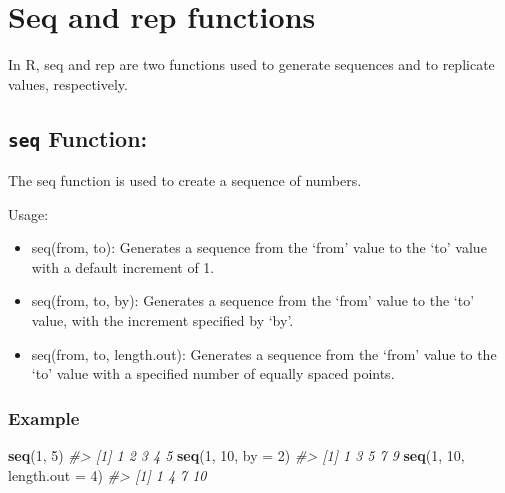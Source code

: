 \documentclass[
]{book}
\newenvironment{Shaded}{\begin{snugshade}}{\end{snugshade}}
\newcommand{\AttributeTok}[1]{\textcolor[rgb]{0.13,0.29,0.53}{#1}}
\newcommand{\CommentTok}[1]{\textcolor[rgb]{0.56,0.35,0.01}{\textit{#1}}}
\newcommand{\DecValTok}[1]{\textcolor[rgb]{0.00,0.00,0.81}{#1}}
\newcommand{\FunctionTok}[1]{\textcolor[rgb]{0.13,0.29,0.53}{\textbf{#1}}}
\newcommand{\NormalTok}[1]{#1}
\begin{document}
\section*{Seq and rep functions}\label{seq-and-rep-functions}

In R, seq and rep are two functions used to generate sequences and to replicate values, respectively.

\subsection{\texorpdfstring{\texttt{seq} Function:}{seq Function:}}\label{seq-function}

The seq function is used to create a sequence of numbers.

Usage:

\begin{itemize}
\item
  seq(from, to): Generates a sequence from the `from' value to the `to' value with a default increment of 1.
\item
  seq(from, to, by): Generates a sequence from the `from' value to the `to' value, with the increment specified by `by'.
\item
  seq(from, to, length.out): Generates a sequence from the `from' value to the `to' value with a specified number of equally spaced points.
\end{itemize}

\subsubsection*{Example}\label{example}

\begin{Shaded}
\begin{Highlighting}[]
\FunctionTok{seq}\NormalTok{(}\DecValTok{1}\NormalTok{, }\DecValTok{5}\NormalTok{)         }
\CommentTok{\#\textgreater{} [1] 1 2 3 4 5}
\FunctionTok{seq}\NormalTok{(}\DecValTok{1}\NormalTok{, }\DecValTok{10}\NormalTok{, }\AttributeTok{by =} \DecValTok{2}\NormalTok{)    }
\CommentTok{\#\textgreater{} [1] 1 3 5 7 9}
\FunctionTok{seq}\NormalTok{(}\DecValTok{1}\NormalTok{, }\DecValTok{10}\NormalTok{, }\AttributeTok{length.out =} \DecValTok{4}\NormalTok{) }
\CommentTok{\#\textgreater{} [1]  1  4  7 10}
\end{Highlighting}
\end{Shaded}
\end{document}
